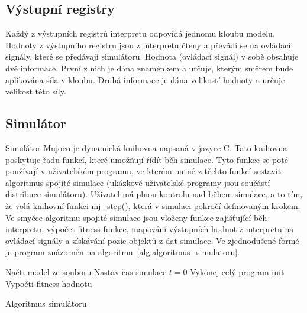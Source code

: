 \subsection{Výstupní registry}

Každý z výstupních registrů interpretu odpovídá jednomu kloubu modelu.
Hodnoty z výstupního registru jsou z interpretu čteny a převádí se na ovládací signály, které se předávají simulátoru.
Hodnota (ovládací signál) v sobě obsahuje dvě informace.
První z nich je dána znaménkem a určuje, kterým směrem bude aplikována síla v kloubu.
Druhá informace je dána velikostí hodnoty a určuje velikost této síly.


\subsection{Simulátor}
Simulátor Mujoco je dynamická knihovna napsaná v jazyce C.
Tato knihovna poskytuje řadu funkcí, které umožňují řídít běh simulace.
Tyto funkce se poté používají v uživatelském programu, ve kterém nutné z těchto funkcí sestavit algoritmus spojité simulace (ukázkové uživatelské programy jsou součástí distribuce simulátoru).
Uživatel má plnou kontrolu nad během simulace, a to tím, že volá knihovní funkci mj\_step(), která v simulaci pokročí definovaným krokem.
Ve smyčce algoritmu spojité simulace jsou vloženy funkce zajišťující běh interpretu, výpočet fitness funkce, mapování výstupních hodnot z interpretu na ovládací signály a získávání pozic objektů z dat simulace.
Ve zjednodušené formě je program znázorněn na algoritmu~\ref{alg:algoritmus_simulatoru}.


\begin{algorithm}[H]
    Načti model ze souboru\;
    Nastav čas simulace $t = 0$\;
    Vykonej celý program init\;
    Vypočti fitness hodnotu\;
    \caption{Algoritmus simulátoru}
    \label{alg:algoritmus_simulatoru}
\end{algorithm}

